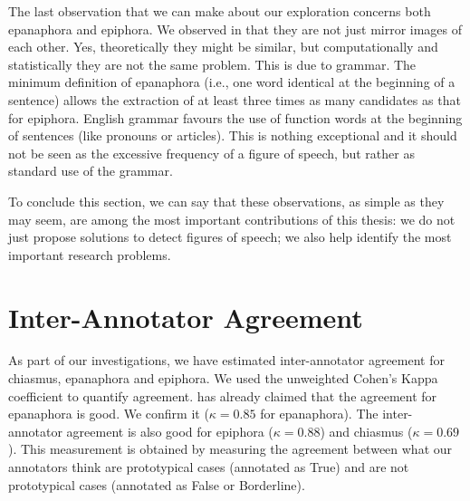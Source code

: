 The last observation that we can make about our exploration concerns both epanaphora and epiphora. We observed in  that they are not just mirror images of each other. Yes, theoretically they might be similar, but computationally and statistically they are not the same problem. This is due to grammar. The minimum definition of epanaphora (i.e., one word identical at the beginning of a sentence) allows the extraction of at least three times as many candidates as that for epiphora. English grammar favours the use of function words at the beginning of sentences (like pronouns or articles). This is nothing exceptional and it should not be seen as the excessive frequency of a figure of speech, but rather as standard use of the grammar.

To conclude this section, we can say that these observations, as simple as they may seem, are among the most important contributions of this thesis: we do not just propose solutions to detect figures of speech; we also help identify the most important research problems.
\section{Inter-Annotator Agreement}

As part of our investigations, we have estimated inter-annotator agreement for chiasmus, epanaphora and epiphora. We used the unweighted Cohen's Kappa coefficient to quantify agreement. \cite{Strommer2011} has already claimed that the agreement for epanaphora is good. We confirm it ($\kappa =0.85$ for epana\-phora).  The inter-annotator agreement is also good for epiphora ($\kappa =0.88$) and chiasmus ($\kappa =0.69$). This measurement is obtained by measuring the agreement between what our annotators think are prototypical cases (annotated as True) and are not prototypical cases (annotated as False or Borderline). 

